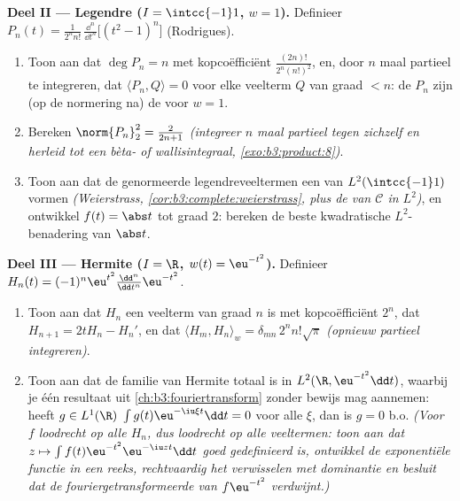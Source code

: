 \begin{problem}
\medskip
\noindent\textbf{Deel II --- Legendre ($I = \intcc{-1}1$, $w =
1$).} Definieer $P_n(t) = \frac{1}{2^nn!}\,\frac{\dd^n}{\dd
t^n}\bigl[(t^2 - 1)^n\bigr]$ (Rodrigues).
\begin{enumerate}[resume]
  \item Toon aan dat $\deg P_n = n$ met kopcoëfficiënt
        $\frac{(2n)!}{2^n(n!)^2}$, en, door $n$ maal partieel te
        integreren, dat $\langle P_n, Q\rangle = 0$ voor elke
        veelterm $Q$ van graad $< n$: de $P_n$ zijn (op de
        normering na) de  voor $w = 1$.
  \item Bereken $\norm{P_n}_2^2 = \frac{2}{2n+1}$
        \emph{(integreer $n$ maal partieel tegen zichzelf en
        herleid tot een bèta- of wallisintegraal,
        \cref{exo:b3:product:8})}.
  \item Toon aan dat de genormeerde legendreveeltermen een
         van $L^2(\intcc{-1}1)$ vormen
        \emph{(Weierstrass, \cref{cor:b3:complete:weierstrass},
        plus de  van $\mathcal C$ in $L^2$)}, en
        ontwikkel $f(t) = \abs t$ tot graad $2$: bereken de beste
        kwadratische $L^2$-benadering van $\abs t$.
\end{enumerate}

\medskip
\noindent\textbf{Deel III --- Hermite ($I = \R$, $w(t) =
\eu^{-t^2}$).} Definieer $H_n(t) =
(-1)^n\eu^{t^2}\frac{\dd^n}{\dd t^n}\eu^{-t^2}$.
\begin{enumerate}[resume]
  \item Toon aan dat $H_n$ een veelterm van graad $n$ is met
        kopcoëfficiënt $2^n$, dat $H_{n+1} = 2tH_n - H_n'$, en
        dat $\langle H_m, H_n\rangle_w = \delta_{mn}\,2^nn!
        \sqrt\pi$ \emph{(opnieuw partieel integreren)}.
  \item Toon aan dat de familie van Hermite totaal is in
        $L^2(\R, \eu^{-t^2}\dd t)$, waarbij je één resultaat uit
        \cref{ch:b3:fouriertransform} zonder bewijs mag
        aannemen: heeft $g \in L^1(\R)$ $\int g(t)\eu^{-\iu\xi
        t}\dd t = 0$ voor alle $\xi$, dan is $g = 0$ b.o.
        \emph{(Voor $f$ loodrecht op alle $H_n$, dus loodrecht op
        alle veeltermen: toon aan dat $z \mapsto \int
        f(t)\eu^{-t^2}\eu^{-\iu zt}\dd t$ goed gedefinieerd is,
        ontwikkel de exponentiële functie in een reeks,
        rechtvaardig het verwisselen met dominantie en besluit
        dat de fouriergetransformeerde van $f\eu^{-t^2}$
        verdwijnt.)}
\end{enumerate}


\end{problem}
